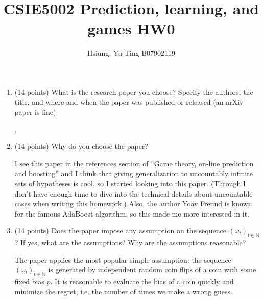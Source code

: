 \documentclass[a4paper, 12pt]{article}
\title{CSIE5002 Prediction, learning, and games HW0}
\author{Hsiung, Yu-Ting B07902119}
\newcommand{\N}{\mathbb{N}}
\begin{document}
\maketitle

\begin{enumerate}
    \item (14 points) What is the research paper you choose? Specify the authors, the title, and where and when the paper was published or released (an arXiv paper is fine).
    \par {\color{blue} .}
    \item (14 points) Why do you choose the paper?
    \par {\color{blue} I see this paper in the references section of ``Game theory, on-line prediction and boosting'' \cite{freund1996game} and I think that giving generalization to uncountably infinite sets of hypotheses is cool, so I started looking into this paper. (Through I don't have enough time to dive into the technical details about uncountable cases when writing this homework.) Also, the author Yoav Freund is known for the famous AdaBoost algorithm, so this made me more interested in it.}
    \item (14 points) Does the paper impose any assumption on the sequence $(\omega_t)_{t \in \N}$? If yes, what are the assumptions? Why are the assumptions reasonable?
    \par {\color{blue} The paper applies the most popular simple assumption: the sequence $(\omega_t)_{t \in \N}$ is generated by independent random coin flips of a coin with some fixed bias $p$. It is reasonable to evaluate the bias of a coin quickly and minimize the regret, i.e. the number of times we make a wrong guess.}


\end{enumerate}
\end{document}
